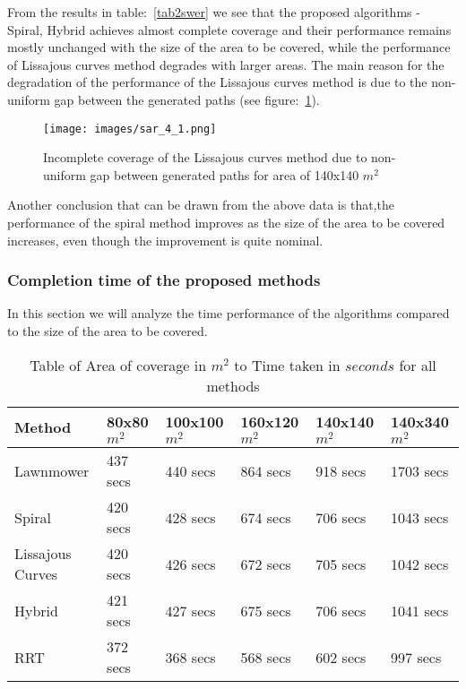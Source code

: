 From the results in table:~\ref{tab2swer} we see that the proposed algorithms - Spiral, Hybrid achieves almost complete coverage and their performance remains mostly unchanged with the size of the area to be covered, while the performance of Lissajous curves method degrades with larger areas. The main reason for the degradation of the performance of the Lissajous curves method is due to the non-uniform gap between the generated paths (see figure:~\ref{fig:lci1234}).

\begin{figure}[htbp]

  \texttt{[image: images/sar\_4\_1.png]}
  \caption{Incomplete coverage of the Lissajous curves method due to non-uniform gap between generated paths for area of 140x140 $m^{2}$ }\label{fig:lci1234} 
\end{figure}

Another conclusion that can be drawn from the above data is that,the performance of the spiral method improves as the size of the area to be covered increases, even though the improvement is quite nominal. 

\pagebreak
\subsubsection{Completion time of the proposed methods}
In this section we will analyze the time performance of the algorithms compared to the size of the area to be covered.

\begin{table}[htbp]
\centering
\caption{Table of Area of coverage in $m^{2}$ to Time taken in $seconds$ for all methods}
\label{tab:tabtim3232}
\begin{tabular}{|l|l|l|l|l|l|}
														\\ \hline
Method           & 80x80 $m^{2}$ & 100x100 $m^{2}$ & 160x120 $m^{2}$ & 140x140 $m^{2}$ & 140x340 $m^{2}$ \\ \hline
Lawnmower        & 437 secs                  & 440 secs                    & 864 secs                    & 918 secs                    & 1703 secs                   \\ \hline
Spiral           & 420 secs                  & 428 secs                    & 674 secs                    & 706 secs                    & 1043 secs                   \\ \hline
Lissajous Curves & 420 secs                  & 426 secs                    & 672 secs                    & 705 secs                    & 1042 secs                   \\ \hline
Hybrid           & 421 secs                  & 427 secs                    & 675 secs                    & 706 secs                    & 1041 secs                   \\ \hline
RRT              & 372 secs                  & 368 secs                    & 568 secs                    & 602 secs                    & 997 secs                   
\end{tabular}
\end{table}

